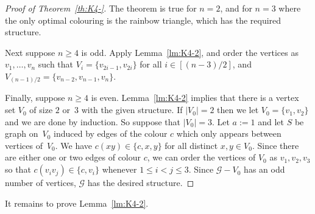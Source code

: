 \documentclass[a4paper, 12pt]{article}
\numberwithin{equation}{section}
\newcommand{\ms}[1]{\mathscr{#1}}
\begin{document}
\begin{proof}[Proof of Theorem~\ref{th:K4-}]
The theorem is true for $n=2$, and for $n=3$ where the only optimal colouring is the rainbow triangle, which has the required structure.


Next suppose $n \geq 4$ is odd.
Apply Lemma~\ref{lm:K4-2}, and order the vertices as $v_1,\dots,v_n$ such that $V_i = \{v_{2i-1},v_{2i}\}$ for all $i \in [(n-3)/2]$, and $V_{(n-1)/2} = \{v_{n-2},v_{n-1},v_n\}$.

Finally, suppose $n \geq 4$ is even.
Lemma~\ref{lm:K4-2} implies that there is a vertex set $V_0$ of size $2$ or~$3$ with the given structure.
If $|V_0|=2$ then we let $V_0 = \{v_1,v_2\}$ and we are done by induction.
So suppose that $|V_0|=3$.
Let $a := 1$ and let $S$ be graph on~$V_0$ induced by edges of the colour $c$ which only appears between vertices of~$V_0$.
We have $c(xy) \in \{c,x,y\}$ for all distinct $x,y \in V_0$.
Since there are either one or two edges of colour $c$, we can order the vertices of $V_0$ as $v_1,v_2,v_3$ so that $c(v_iv_j) \in \{c,v_i\}$ whenever $1 \leq i < j \leq 3$.
Since $\ms{G}-V_0$ has an odd
number of vertices, $\ms{G}$ has the desired structure.
\end{proof}


It remains to prove Lemma~\ref{lm:K4-2}.
\end{document}
